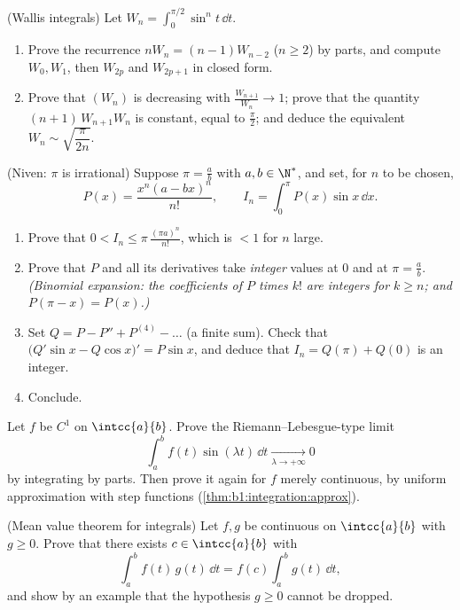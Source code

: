 \begin{exercise}[$\star\star\star$]\label{exo:b1:integration:8}
(Wallis integrals) Let $W_n = \int_0^{\pi/2} \sin^n t\,\dd t$.
\begin{enumerate}
  \item Prove the recurrence $n W_n = (n-1) W_{n-2}$ ($n \geq 2$) by
        parts, and compute $W_0, W_1$, then $W_{2p}$ and $W_{2p+1}$
        in closed form.
  \item Prove that $(W_n)$ is decreasing with $\frac{W_{n+1}}{W_n}
        \to 1$; prove that the quantity $(n+1)\,W_{n+1} W_n$ is
        constant, equal to $\frac\pi2$; and deduce the equivalent
        $W_n \sim \sqrt{\dfrac{\pi}{2n}}$.
\end{enumerate}
\end{exercise}

\begin{exercise}[$\star\star\star$]\label{exo:b1:integration:9}
(Niven: $\pi$ is irrational) Suppose $\pi = \frac ab$ with $a, b \in
\N^*$, and set, for $n$ to be chosen,
\[
P(x) = \frac{x^n (a - bx)^n}{n!},
\qquad
I_n = \int_0^{\pi} P(x)\sin x\, \dd x .
\]
\begin{enumerate}
  \item Prove that $0 < I_n \leq \pi\,\frac{(\pi a)^n}{n!}$, which is
        $< 1$ for $n$ large.
  \item Prove that $P$ and all its derivatives take \emph{integer}
        values at $0$ and at $\pi = \frac ab$. \emph{(Binomial
        expansion: the coefficients of $P$ times $k!$ are integers
        for $k \geq n$; and $P(\pi - x) = P(x)$.)}
  \item Set $Q = P - P'' + P^{(4)} - \dots$ (a finite sum). Check
        that $\bigl(Q'\sin x - Q\cos x\bigr)' = P \sin x$, and deduce
        that $I_n = Q(\pi) + Q(0)$ is an integer.
  \item Conclude.
\end{enumerate}
\end{exercise}

\begin{exercise}[$\star\star\star$]\label{exo:b1:integration:10}
Let $f$ be $C^1$ on $\intcc{a}{b}$. Prove the Riemann--Lebesgue-type
limit
\[
\int_a^b f(t)\sin(\lambda t)\,\dd t \xrightarrow[\lambda \to
+\infty]{} 0
\]
by integrating by parts. Then prove it again for $f$ merely
continuous, by uniform approximation with step functions
(\cref{thm:b1:integration:approx}).
\end{exercise}

\begin{exercise}[$\star\star$]\label{exo:b1:integration:11}
(Mean value theorem for integrals) Let $f, g$ be continuous on
$\intcc{a}{b}$ with $g \geq 0$. Prove that there exists $c \in
\intcc{a}{b}$ with
\[
\int_a^b f(t)\,g(t)\,\dd t = f(c)\int_a^b g(t)\,\dd t ,
\]
and show by an example that the hypothesis $g \geq 0$ cannot be
dropped.
\end{exercise}

